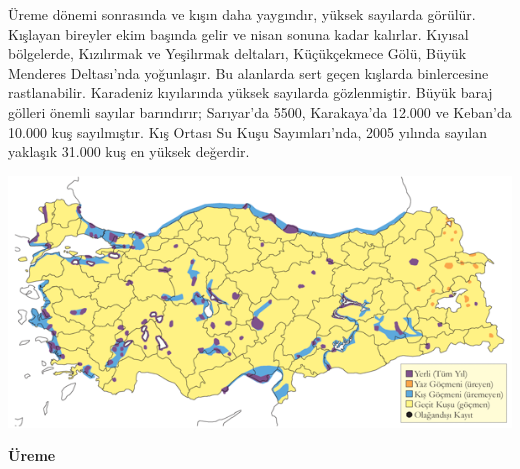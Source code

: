 \documentclass[
  a4paper,
  DIV=11,
  numbers=noendperiod]{scrreprt}
\begin{document}
Üreme dönemi sonrasında ve kışın daha yaygındır, yüksek sayılarda
görülür. Kışlayan bireyler ekim başında gelir ve nisan sonuna kadar
kalırlar. Kıyısal bölgelerde, Kızılırmak ve Yeşilırmak deltaları,
Küçükçekmece Gölü, Büyük Menderes Deltası'nda yoğunlaşır. Bu alanlarda
sert geçen kışlarda binlercesine rastlanabilir. Karadeniz kıyılarında
yüksek sayılarda gözlenmiştir. Büyük baraj gölleri önemli sayılar
barındırır; Sarıyar'da 5500, Karakaya'da 12.000 ve Keban'da 10.000 kuş
sayılmıştır. Kış Ortası Su Kuşu Sayımları'nda, 2005 yılında sayılan
yaklaşık 31.000 kuş en yüksek değerdir.

\includegraphics{images/harita_Page_053.png}

\textbf{Üreme}
\end{document}
